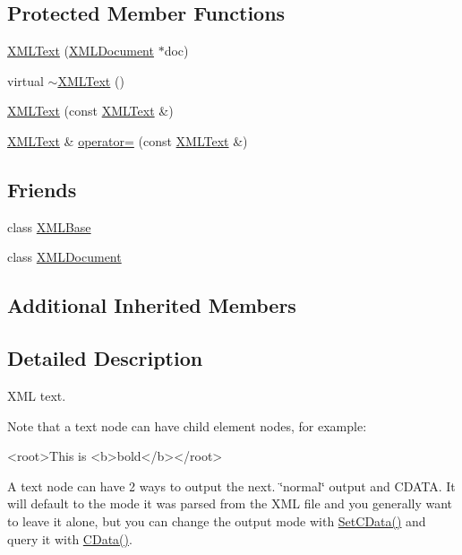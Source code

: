 \subsection*{Protected Member Functions}
\begin{DoxyCompactItemize}
\item 
\hyperlink{classtinyxml2_1_1_x_m_l_text_ad9f46d70e61e5386ead93728d8b90267}{X\+M\+L\+Text} (\hyperlink{classtinyxml2_1_1_x_m_l_document}{X\+M\+L\+Document} $\ast$doc)
\item 
virtual \hyperlink{classtinyxml2_1_1_x_m_l_text_ae9b8790d0dc13914394dbd7437c0e59d}{$\sim$\+X\+M\+L\+Text} ()
\item 
\hyperlink{classtinyxml2_1_1_x_m_l_text_a002156e1f61ee6d48e5368b7cca25582}{X\+M\+L\+Text} (const \hyperlink{classtinyxml2_1_1_x_m_l_text}{X\+M\+L\+Text} \&)
\item 
\hyperlink{classtinyxml2_1_1_x_m_l_text}{X\+M\+L\+Text} \& \hyperlink{classtinyxml2_1_1_x_m_l_text_ad8c9f398d92fa472e213b89d8483ae8f}{operator=} (const \hyperlink{classtinyxml2_1_1_x_m_l_text}{X\+M\+L\+Text} \&)
\end{DoxyCompactItemize}
\subsection*{Friends}
\begin{DoxyCompactItemize}
\item 
class \hyperlink{classtinyxml2_1_1_x_m_l_text_a449202cfc89e7ae5c2f81995476f9ec1}{X\+M\+L\+Base}
\item 
class \hyperlink{classtinyxml2_1_1_x_m_l_text_a4eee3bda60c60a30e4e8cd4ea91c4c6e}{X\+M\+L\+Document}
\end{DoxyCompactItemize}
\subsection*{Additional Inherited Members}


\subsection{Detailed Description}
X\+M\+L text.

Note that a text node can have child element nodes, for example\+: \begin{DoxyVerb}<root>This is <b>bold</b></root>
\end{DoxyVerb}


A text node can have 2 ways to output the next. \char`\"{}normal\char`\"{} output and C\+D\+A\+T\+A. It will default to the mode it was parsed from the X\+M\+L file and you generally want to leave it alone, but you can change the output mode with \hyperlink{classtinyxml2_1_1_x_m_l_text_ad080357d76ab7cc59d7651249949329d}{Set\+C\+Data()} and query it with \hyperlink{classtinyxml2_1_1_x_m_l_text_a125574fe49da80efbae1349f20d02d41}{C\+Data()}. 

